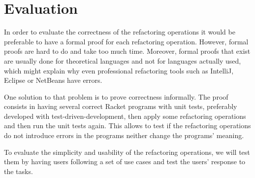 
% 
% 

\section{Evaluation}


In order to evaluate the correctness of the refactoring operations it would be preferable to have a formal proof for each refactoring operation.
However, formal proofs are hard to do and take too much time.
Moreover, formal proofs that exist are usually done for theoretical languages and not for languages actually used, which might explain why even professional refactoring tools such as IntelliJ, Eclipse or NetBeans have errors. \cite{verbaere2006jungl} 

One solution to that problem is to prove correctness informally. 
The proof consists in having several correct Racket programs with unit tests, preferably developed with test-driven-development, then apply some refactoring operations and then run the unit tests again. 
This allows to test if the refactoring operations do not introduce errors in the programs neither change the programs' meaning.

To evaluate the simplicity and usability of the refactoring operations, we will test them by having users following a set of use cases and test the users' response to the tasks.